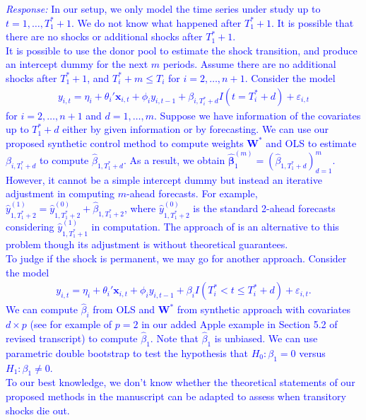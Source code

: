 \documentclass[12pt]{article}
\newcommand{\response}[1]{\noindent \textcolor{blue}{\emph{Response:} #1}}
\begin{document}
\response{In our setup, we only model the time series under study up to $t = 1, \ldots, T_1^*+1$.  We do not know what happened  after $T_1^*+1$. It is possible that there are no shocks or additional shocks after $T_1^*+1$. \\

It is possible to use the donor pool to estimate the shock transition,  and produce an intercept dummy for the next $m$ periods. Assume there are no additional shocks  after $T_1^*+1$, and $T_i^*+m \leq T_i$ for $i = 2, \ldots, n+1$. Consider the model
\begin{align*}
  y_{i,t} = \eta_i + \theta_i'\mathbf{x}_{i,t} + \phi_i y_{i,t-1 }+\beta_{i, T_i^* + d}I(t = T_i^*+d) +\varepsilon_{i,t}
\end{align*}
for $i = 2, \ldots, n+1$ and $d = 1, \ldots, m$. Suppose we have information of the covariates up to $T_1^*+d$ either by given information or by forecasting. We can use our proposed synthetic control method to compute weights $\mathbf{W}^*$ and OLS to estimate $\beta_{i, T_i^*+d}$ to compute $\hat{\beta}_{1, T_1^*+d}$.  As a result, we obtain $\hat{\boldsymbol{\beta}}_1^{(m)} = (\hat{\beta}_{1, T_1^*+d})_{d = 1}^m$. However, it cannot be a simple intercept dummy but instead an iterative adjustment in computing $m$-ahead forecasts. For example, $\hat{y}_{1, T_1^*+2}^{(1)}=\hat{y}_{1, T_1^*+2}^{(0)}+ \hat{\beta}_{1, T_1^*+2}$, where $\hat{y}_{1, T_1^*+2}^{(0)}$ is the standard 2-ahead forecasts considering $\hat{y}_{1, T_1^*+1}^{(1)}$ in computation.  The approach of \cite{agarwal2020two} is an alternative  to this problem though its adjustment is without theoretical guarantees. \\

To judge if the shock is permanent, we may go for another approach. Consider the model
\begin{align*}
  y_{i,t} = \eta_i + \theta_i'\mathbf{x}_{i,t} + \phi_i y_{i,t-1 }+\beta_{i}I(T_i^*< t \leq  T_i^*+d) +\varepsilon_{i,t}.
\end{align*}
We can compute $\hat{\beta}_i$ from OLS and $\mathbf{W}^*$ from synthetic approach with covariates $d \times p$ (see for example of $p = 2$ in our added Apple example in Section 5.2 of revised transcript) to compute $\hat{\beta}_1$. Note that $\hat{\beta}_1$ is unbiased. We can use parametric double bootstrap to test the hypothesis that $H_0 \colon \beta_1=0$ versus $H_1 \colon \beta_1\neq 0$. \\

To our best knowledge, we don't know whether the theoretical statements of our proposed methods in the manuscript can be adapted to assess when transitory shocks die out.} \\
\end{document}
